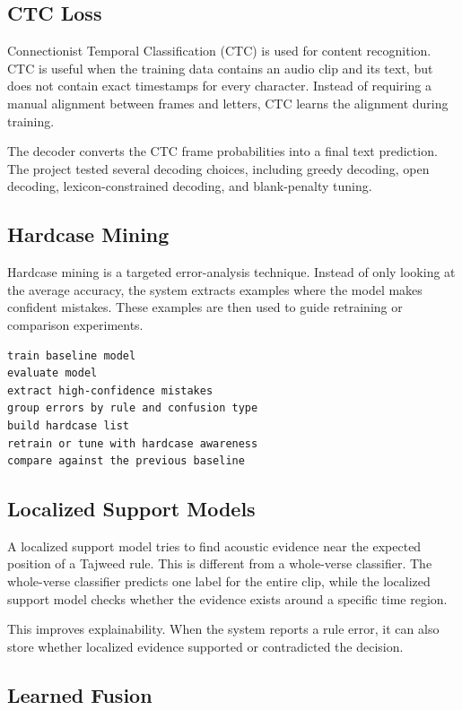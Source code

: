 \documentclass[12pt,a4paper]{report}
\begin{document}
\subsection{CTC Loss}

Connectionist Temporal Classification (CTC) is used for content recognition.
CTC is useful when the training data contains an audio clip and its text, but
does not contain exact timestamps for every character. Instead of requiring a
manual alignment between frames and letters, CTC learns the alignment during
training.

The decoder converts the CTC frame probabilities into a final text prediction.
The project tested several decoding choices, including greedy decoding,
open decoding, lexicon-constrained decoding, and blank-penalty tuning.

\subsection{Hardcase Mining}

Hardcase mining is a targeted error-analysis technique. Instead of only looking
at the average accuracy, the system extracts examples where the model makes
confident mistakes. These examples are then used to guide retraining or
comparison experiments.

\begin{lstlisting}[caption={Hardcase mining loop.},label={lst:hardcase_loop}]
train baseline model
evaluate model
extract high-confidence mistakes
group errors by rule and confusion type
build hardcase list
retrain or tune with hardcase awareness
compare against the previous baseline
\end{lstlisting}

\subsection{Localized Support Models}

A localized support model tries to find acoustic evidence near the expected
position of a Tajweed rule. This is different from a whole-verse classifier.
The whole-verse classifier predicts one label for the entire clip, while the
localized support model checks whether the evidence exists around a specific
time region.

This improves explainability. When the system reports a rule error, it can also
store whether localized evidence supported or contradicted the decision.

\subsection{Learned Fusion}
\end{document}
